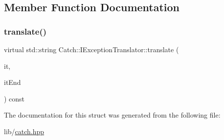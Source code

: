 \subsection{Member Function Documentation}
\hypertarget{struct_catch_1_1_i_exception_translator_a2a554b96ed5ed411e7c796b6b42837a5}{}\label{struct_catch_1_1_i_exception_translator_a2a554b96ed5ed411e7c796b6b42837a5} 
\subsubsection{\texorpdfstring{translate()}{translate()}}
{\footnotesize\ttfamily virtual std\+::string Catch\+::\+I\+Exception\+Translator\+::translate (\begin{DoxyParamCaption}\item[{Exception\+Translators\+::const\+\_\+iterator}]{it,  }\item[{Exception\+Translators\+::const\+\_\+iterator}]{it\+End }\end{DoxyParamCaption}) const\hspace{0.3cm}{\ttfamily [pure virtual]}}



The documentation for this struct was generated from the following file\+:\begin{DoxyCompactItemize}
\item 
lib/\hyperlink{catch_8hpp}{catch.\+hpp}\end{DoxyCompactItemize}
